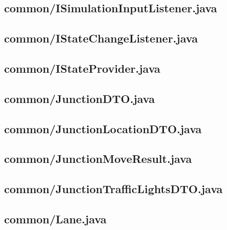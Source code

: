 \subsection{common/ISimulationInputListener.java}

\newpage
\subsection{common/IStateChangeListener.java}

\newpage
\subsection{common/IStateProvider.java}

\newpage
\subsection{common/JunctionDTO.java}

\newpage
\subsection{common/JunctionLocationDTO.java}

\newpage
\subsection{common/JunctionMoveResult.java}

\newpage
\subsection{common/JunctionTrafficLightsDTO.java}

\newpage
\subsection{common/Lane.java}

\newpage
